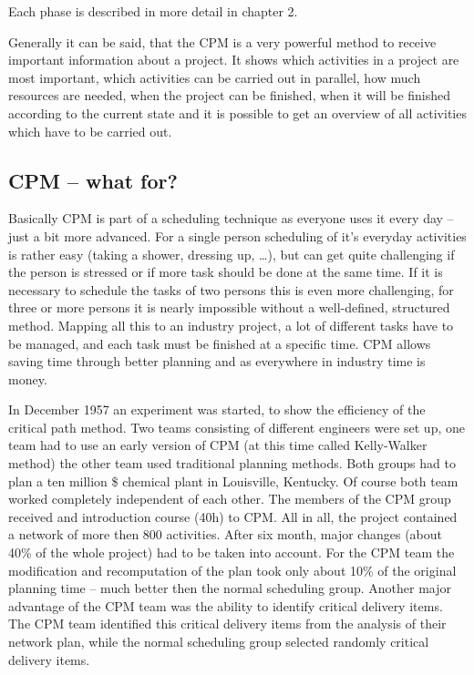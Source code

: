 Each phase is described in more detail in chapter 2.

Generally it can be said, that the CPM is a very powerful method to receive important information
about a project. It shows which activities in a project are most important, which activities can be
carried out in parallel, how much resources are needed, when the project can be finished, when it
will be finished according to the current state and it is possible to get an overview of all
activities which have to be carried out.

\subsection{CPM – what for?}

Basically CPM is part of a scheduling technique as everyone uses it every day – just a bit more
advanced. For a single person scheduling of it’s everyday activities is rather easy (taking a
shower, dressing up, …), but can get quite challenging if the person is stressed or if more task
should be done at the same time. If it is necessary to schedule the tasks of two persons this is
even more challenging, for three or more persons it is nearly impossible without a well-defined,
structured method. Mapping all this to an industry project, a lot of different tasks have to be
managed, and each task must be finished at a specific time. CPM allows saving time through better
planning and as everywhere in industry time is money.

In December 1957 an experiment was started, to show the efficiency of the critical path method. Two
teams consisting of different engineers were set up, one team had to use an early version of CPM (at
this time called Kelly-Walker method) the other team used traditional planning methods. Both groups
had to plan a ten million \$ chemical plant in Louisville, Kentucky. Of course both team worked
completely independent of each other. The members of the CPM group received and introduction course
(40h) to CPM. All in all, the project contained a network of more then 800 activities. After six
month, major changes (about 40\% of the whole project) had to be taken into account. For the CPM team
the modification and recomputation of the plan took only about 10\% of the original planning time –
much better then the normal scheduling group.  Another major advantage of the CPM team was the
ability to identify critical delivery items. The CPM team identified this critical delivery items
from the analysis of their network plan, while the normal scheduling group selected randomly
critical delivery items\cite{obrien}. 

